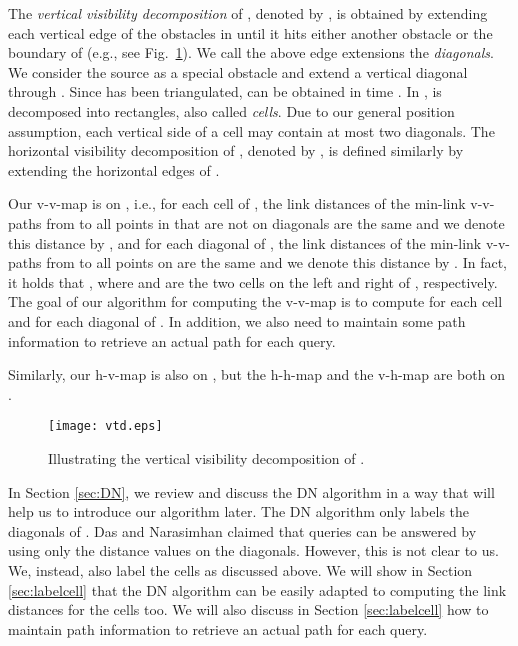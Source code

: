 \documentclass[english,runningheads,11pt]{llncs-revised}
\begin{document}
The {\em vertical visibility decomposition} of , denoted by
,
is obtained by extending each vertical edge of the obstacles in
 until it hits either another obstacle or
the boundary of  (e.g., see Fig.~\ref{fig:vtd}).
We call the above edge extensions the {\em diagonals}.
We consider the source  as a special obstacle and extend a vertical diagonal
through .
Since  has been triangulated,   can be obtained in
 time \cite{ref:Bar-YehudaTr94,ref:ChazelleTr91,ref:ChazelleTr84,ref:FournierTr84}.
In ,  is decomposed into rectangles,
also called {\em cells}. Due to our general position
assumption, each vertical side of a cell may contain at most two diagonals.
The horizontal visibility decomposition of , denoted by , is
defined similarly by extending the horizontal edges of .

Our v-v-map is on , i.e., for each cell  of
, the
link distances of the min-link v-v-paths from  to all points in 
that are not on diagonals
are the same and we denote this distance by , and for
each diagonal  of , the
link distances of the min-link v-v-paths from  to all points on 
are the same and we denote this distance by . In fact, it holds that ,
where  and  are the two cells on the left and right of ,
respectively.
The goal of our algorithm for computing the v-v-map is to compute
 for each cell  and  for each
diagonal  of .  In
addition, we also need to maintain some path information to retrieve
an actual path for each query.

Similarly, our h-v-map is also on , but the h-h-map and the v-h-map
are both on .

\begin{figure}[t]
\begin{minipage}[t]{\linewidth}
\begin{center}
\texttt{[image: vtd.eps]}
\caption{\footnotesize Illustrating the vertical visibility
decomposition of . }
\label{fig:vtd}
\end{center}
\end{minipage}
\vspace{-0.15in}
\end{figure}



In Section \ref{sec:DN}, we review and discuss the DN algorithm \cite{ref:DasGe91} in a way that will help us to introduce our algorithm later. The DN algorithm only labels the diagonals of .
Das and Narasimhan \cite{ref:DasGe91} claimed that queries can be
answered by using only the distance values on the diagonals. However,
this is not clear to us. We, instead, also label the cells
as discussed above. We will show in Section \ref{sec:labelcell} that the DN algorithm can be easily
adapted to computing the link distances for the cells too. We will also discuss in Section \ref{sec:labelcell} how to maintain path information to retrieve an actual path for each query.
\end{document}
